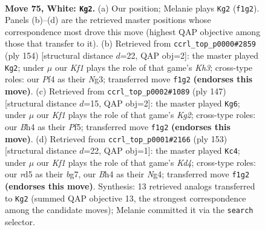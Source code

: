 \documentclass[11pt]{article}
\begin{document}
\clearpage

\begin{figure}[p]\centering
\begin{subfigure}{0.46\textwidth}\centering
\resizebox{\linewidth}{!}{%
\newchessgame
\chessboard[
  setfen={4R3/3n3k/8/3r4/p4P1B/P6P/8/5K2 w - - 5 75},
  showmover=false,
  pgfstyle=straightmove, color=movearrow, markmove={f1-g2}
]}
\caption{}
\end{subfigure}\hfill
\begin{subfigure}{0.46\textwidth}\centering
\resizebox{\linewidth}{!}{%
\newchessgame
\chessboard[
  setfen={8/3k4/5p2/8/1r1n1P2/6NK/8/4R3 w - - 13 78},
  showmover=false,
  pgfstyle=straightmove, color=movearrow, markmove={h3-g2}
]}
\caption{}
\end{subfigure}
\\[4pt]
\begin{subfigure}{0.46\textwidth}\centering
\resizebox{\linewidth}{!}{%
\newchessgame
\chessboard[
  setfen={8/6k1/8/5ppR/3P4/r7/5K1N/8 b - - 10 74},
  showmover=false,
  pgfstyle=straightmove, color=movearrow, markmove={g7-g6}
]}
\caption{}
\end{subfigure}\hfill
\begin{subfigure}{0.46\textwidth}\centering
\resizebox{\linewidth}{!}{%
\newchessgame
\chessboard[
  setfen={8/6B1/p7/3k2p1/6n1/P2N4/2p1K3/8 b - - 6 77},
  showmover=false,
  pgfstyle=straightmove, color=movearrow, markmove={d5-c4}
]}
\caption{}
\end{subfigure}
\caption{\textbf{Move 75, White: \texttt{Kg2}.} (a) Our position; Melanie plays \texttt{Kg2} (\texttt{f1g2}). Panels (b)--(d) are the retrieved master positions whose correspondence most drove this move (highest QAP objective among those that transfer to it). (b) Retrieved from \texttt{ccrl\_top\_p0000\#2859} (ply 154) [structural distance $d$=22, QAP obj=2]: the master played \texttt{Kg2}; under $\mu$ our \emph{Kf1} plays the role of that game's \emph{Kh3}; cross-type roles: our \emph{P}f4 as their \emph{N}g3; transferred move \texttt{f1g2} \textbf{(endorses this move)}. (c) Retrieved from \texttt{ccrl\_top\_p0002\#1089} (ply 147) [structural distance $d$=15, QAP obj=2]: the master played \texttt{Kg6}; under $\mu$ our \emph{Kf1} plays the role of that game's \emph{Kg2}; cross-type roles: our \emph{B}h4 as their \emph{P}f5; transferred move \texttt{f1g2} \textbf{(endorses this move)}. (d) Retrieved from \texttt{ccrl\_top\_p0001\#2166} (ply 153) [structural distance $d$=22, QAP obj=1]: the master played \texttt{Kc4}; under $\mu$ our \emph{Kf1} plays the role of that game's \emph{Kd4}; cross-type roles: our \emph{r}d5 as their \emph{b}g7, our \emph{B}h4 as their \emph{N}g4; transferred move \texttt{f1g2} \textbf{(endorses this move)}. Synthesis: 13 retrieved analogs transferred to \texttt{Kg2} (summed QAP objective 13, the strongest correspondence among the candidate moves); Melanie committed it via the \texttt{search} selector.}
\label{fig:thought-m148}
\end{figure}
\end{document}
